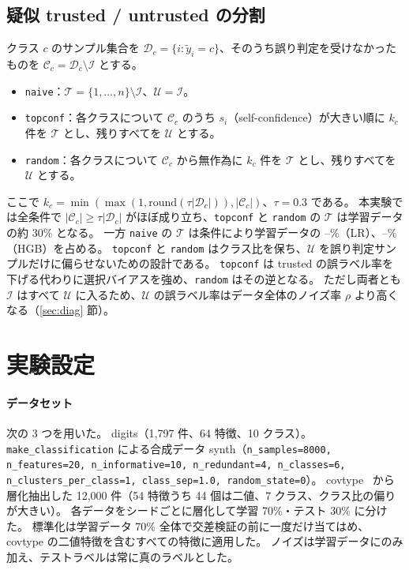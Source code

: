 \documentclass[a4paper,10pt]{ltjsarticle}
\newcommand{\method}[1]{\texttt{#1}}
\begin{document}
\subsection{疑似 trusted / untrusted の分割}\label{sec:split}
クラス $c$ のサンプル集合を $\mathcal{D}_c = \{i : \tilde{y}_i = c\}$、そのうち誤り判定を受けなかったものを $\mathcal{C}_c = \mathcal{D}_c \setminus \mathcal{I}$ とする。
\begin{itemize}
  \item \method{naive}：$\mathcal{T} = \{1,\dots,n\} \setminus \mathcal{I}$、$\mathcal{U} = \mathcal{I}$。
  \item \method{topconf}：各クラスについて $\mathcal{C}_c$ のうち $s_i$（self-confidence）が大きい順に $k_c$ 件を $\mathcal{T}$ とし、残りすべてを $\mathcal{U}$ とする。
  \item \method{random}：各クラスについて $\mathcal{C}_c$ から無作為に $k_c$ 件を $\mathcal{T}$ とし、残りすべてを $\mathcal{U}$ とする。
\end{itemize}
ここで $k_c = \min(\max(1, \mathrm{round}(\tau |\mathcal{D}_c|)), |\mathcal{C}_c|)$、$\tau = 0.3$ である。
本実験では全条件で $|\mathcal{C}_c| \geq \tau |\mathcal{D}_c|$ がほぼ成り立ち、\method{topconf} と \method{random} の $\mathcal{T}$ は学習データの約 30\% となる。
一方 \method{naive} の $\mathcal{T}$ は条件により学習データの \NaiveTSizeMinLR--\NaiveTSizeMaxLR\%（LR）、\NaiveTSizeMinHGB--\NaiveTSizeMaxHGB\%（HGB）を占める。
\method{topconf} と \method{random} はクラス比を保ち、$\mathcal{U}$ を誤り判定サンプルだけに偏らせないための設計である。
\method{topconf} は trusted の誤ラベル率を下げる代わりに選択バイアスを強め、\method{random} はその逆となる。
ただし両者とも $\mathcal{I}$ はすべて $\mathcal{U}$ に入るため、$\mathcal{U}$ の誤ラベル率はデータ全体のノイズ率 $\rho$ より高くなる（\ref{sec:diag} 節）。

\section{実験設定}

\paragraph{データセット}
次の 3 つを用いた。
digits（1,797 件、64 特徴、10 クラス）。
\texttt{make\_classification} による合成データ synth（\texttt{n\_samples=8000, n\_features=20, n\_informative=10, n\_redundant=4, n\_classes=6, n\_clusters\_per\_class=1, class\_sep=1.0, random\_state=0}）。
covtype~\cite{blackard1999covtype} から層化抽出した 12,000 件（54 特徴うち 44 個は二値、7 クラス、クラス比の偏りが大きい）。
各データをシードごとに層化して学習 70\%・テスト 30\% に分けた。
標準化は学習データ 70\% 全体で交差検証の前に一度だけ当てはめ、covtype の二値特徴を含むすべての特徴に適用した。
ノイズは学習データにのみ加え、テストラベルは常に真のラベルとした。
\end{document}
